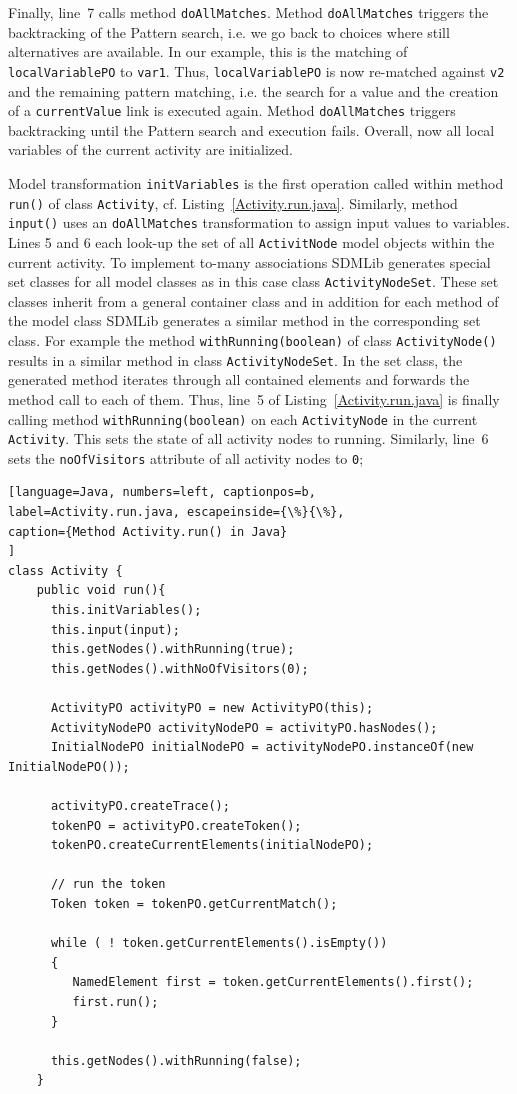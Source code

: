 \documentclass[submission,copyright,creativecommons]{eptcs}
\begin{document}
Finally, line~7 calls method \texttt{doAllMatches}. Method \texttt{doAllMatches} triggers 
the backtracking of the Pattern search, i.e. we go back to choices where still alternatives 
are available. In our example, this is the matching of \texttt{localVariablePO} to 
\texttt{var1}. Thus, \texttt{localVariablePO} is now re-matched against \texttt{v2} and the 
remaining pattern matching, i.e. the search for a value and the creation of a 
\texttt{currentValue} link is executed again. Method \texttt{doAllMatches} triggers backtracking until the Pattern search and execution fails. Overall, now all local variables of the current activity are initialized.  


Model transformation \texttt{initVariables} is the first operation called within 
method \texttt{run()} of class \texttt{Activity}, cf. Listing~\ref{Activity.run.java}. 
Similarly, method \texttt{input()} uses an \texttt{doAllMatches} transformation to 
assign input values to variables. Lines 5 and 6 each look-up the set of all 
\texttt{ActivitNode} model objects within the current activity. To implement to-many associations SDMLib generates special set classes for all model classes 
as in this case class \texttt{ActivityNodeSet}. These set classes inherit from a general 
container class and in addition for each method of the model class SDMLib generates a similar method in the corresponding set class. For example the method 
\texttt{withRunning(boolean)} of class \texttt{ActivityNode()} results in a similar method in class \texttt{ActivityNodeSet}. In the set class, the generated method iterates through all contained elements and forwards the method call to each of them. 
Thus, line~5 of Listing~\ref{Activity.run.java} is finally calling method 
\texttt{withRunning(boolean)} on each \texttt{ActivityNode} in the current 
\texttt{Activity}. This sets the state of all activity nodes to running. Similarly, 
line~6 sets the \texttt{noOfVisitors} attribute of all activity nodes to \texttt{0};

\begin{lstlisting}[language=Java, numbers=left, captionpos=b, 
label=Activity.run.java, escapeinside={\%}{\%},
caption={Method Activity.run() in Java}
]
class Activity {
    public void run(){
      this.initVariables();
      this.input(input);
      this.getNodes().withRunning(true);
      this.getNodes().withNoOfVisitors(0);
      
      ActivityPO activityPO = new ActivityPO(this);
      ActivityNodePO activityNodePO = activityPO.hasNodes();
      InitialNodePO initialNodePO = activityNodePO.instanceOf(new InitialNodePO());

      activityPO.createTrace();
      tokenPO = activityPO.createToken();
      tokenPO.createCurrentElements(initialNodePO);
         
      // run the token
      Token token = tokenPO.getCurrentMatch();
      
      while ( ! token.getCurrentElements().isEmpty())
      {
         NamedElement first = token.getCurrentElements().first();
         first.run();
      }
      
      this.getNodes().withRunning(false);
    }
\end{lstlisting}
\end{document}
